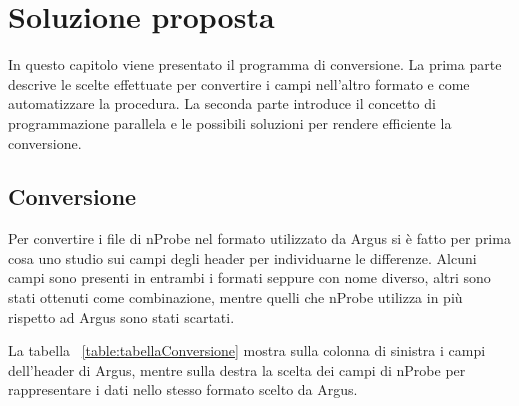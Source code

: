 \documentclass[../main.tex]{subfiles}
\begin{document}
\chapter{Soluzione proposta}

In questo capitolo viene presentato il programma di conversione. La prima parte descrive le scelte effettuate per convertire i campi nell'altro formato e come automatizzare la procedura. La seconda parte introduce il concetto di programmazione parallela e le possibili soluzioni per rendere efficiente la conversione.


\section{Conversione}
Per convertire i file di nProbe nel formato utilizzato da Argus si è fatto per prima cosa uno studio sui campi degli header per individuarne le differenze. Alcuni campi sono presenti in entrambi i formati seppure con nome diverso, altri sono stati ottenuti come combinazione, mentre quelli che nProbe utilizza in più rispetto ad Argus sono stati scartati. 

La tabella ~\ref{table:tabellaConversione} mostra sulla colonna di sinistra i campi dell'header di Argus, mentre sulla destra la scelta dei campi di nProbe per rappresentare i dati nello stesso formato scelto da Argus.
\end{document}
